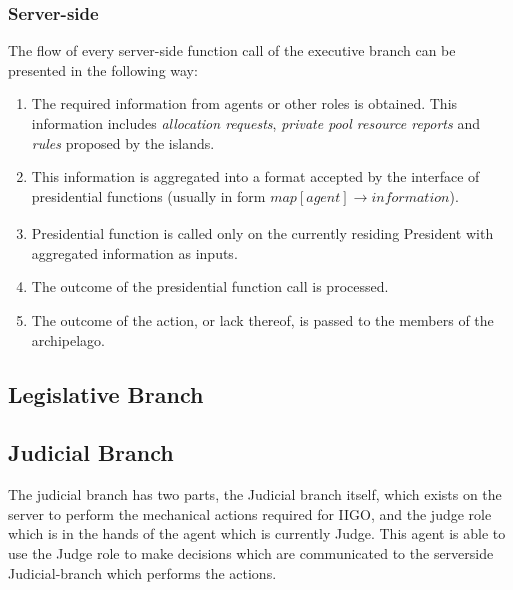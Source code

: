 \subsubsection{Server-side}
\label{sub:president:server-side}


The flow of every server-side function call of the executive branch can be presented in the following way:
\begin{enumerate}
    \item The required information from agents or other roles is obtained. This information includes \emph{allocation requests}, \emph{private pool resource reports} and \emph{rules} proposed by the islands.
    \item This information is aggregated into a format accepted by the interface of presidential functions (usually in form $map[agent] \xrightarrow[]{} information$).
    \item Presidential function is called only on the currently residing President with aggregated information as inputs.
    \item The outcome of the presidential function call is processed.
    \item The outcome of the action, or lack thereof, is passed to the members of the archipelago.
\end{enumerate}

\subsection{Legislative Branch}
\subsection{Judicial Branch}
The judicial branch has two parts, the Judicial branch itself, which exists on the server to perform the mechanical actions required for IIGO, and the judge role which is in the hands of the agent which is currently Judge. This agent is able to use the Judge role to make decisions which  are communicated to the serverside Judicial-branch which performs the actions.

